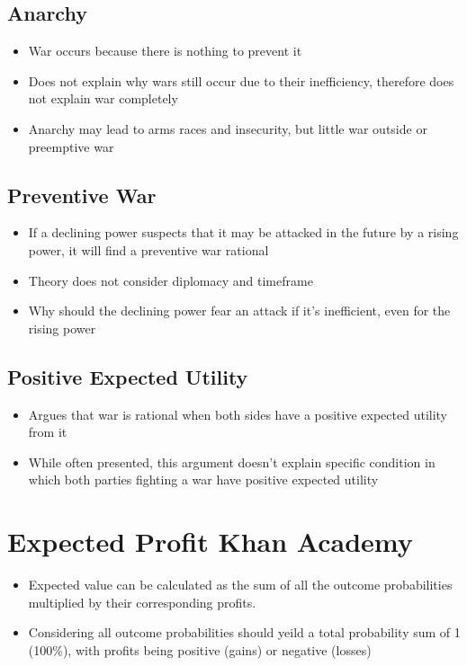 \documentclass[11pt]{article}
\begin{document}
\subsection{Anarchy}
\label{sec:org62e947e}
\begin{itemize}
\item War occurs because there is nothing to prevent it
\item Does not explain why wars still occur due to their inefficiency, therefore does not explain war completely
\item Anarchy may lead to arms races and insecurity, but little war outside or preemptive war
\end{itemize}
\subsection{Preventive War}
\label{sec:org99c3689}
\begin{itemize}
\item If a declining power suspects that it may be attacked in the future by a rising power, it will find a preventive war rational
\item Theory does not consider diplomacy and timeframe
\item Why should the declining power fear an attack if it's inefficient, even for the rising power
\end{itemize}
\subsection{Positive Expected Utility}
\label{sec:orgb60a821}
\begin{itemize}
\item Argues that war is rational when both sides have a positive expected utility from it
\item While often presented, this argument doesn't explain specific condition in which both parties fighting a war have positive expected utility
\end{itemize}
\section{Expected Profit Khan Academy}
\label{sec:org775d491}
\begin{itemize}
\item Expected value can be calculated as the sum of all the outcome probabilities multiplied by their corresponding profits.
\item Considering all outcome probabilities should yeild a total probability sum of 1 (100\%), with profits being positive (gains) or negative (losses)
\end{itemize}
\end{document}
